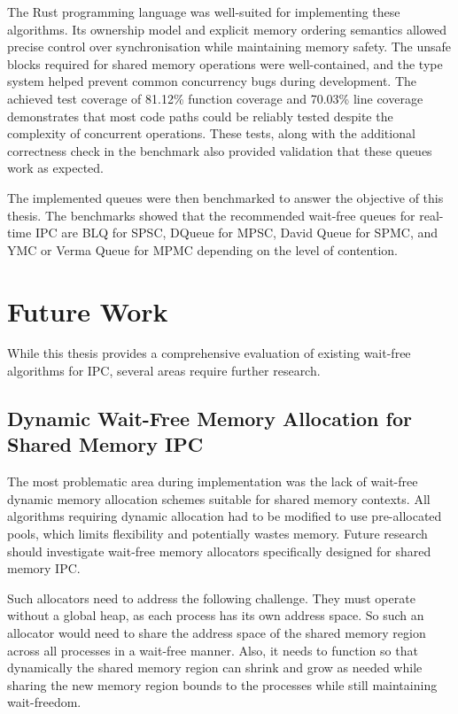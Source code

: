 The Rust programming language was well-suited for implementing these algorithms. Its ownership model and explicit memory ordering semantics allowed precise control over synchronisation while maintaining memory safety. The unsafe blocks required for shared memory operations were well-contained, and the type system helped prevent common concurrency bugs during development. The achieved test coverage of 81.12\% function coverage and 70.03\% line coverage demonstrates that most code paths could be reliably tested despite the complexity of concurrent operations. These tests, along with the additional correctness check in the benchmark also provided validation that these queues work as expected.

The implemented queues were then benchmarked to answer the objective of this thesis. The benchmarks showed that the recommended wait-free queues for real-time \ac{IPC} are \acf{BLQ} for \ac{SPSC}, DQueue for \ac{MPSC}, David Queue for \ac{SPMC}, and \ac{YMC} or Verma Queue for \ac{MPMC} depending on the level of contention.

\section{Future Work}
While this thesis provides a comprehensive evaluation of existing wait-free algorithms for \ac{IPC}, several areas require further research.

\subsection{Dynamic Wait-Free Memory Allocation for Shared Memory \acf{IPC}}
The most problematic area during implementation was the lack of wait-free dynamic memory allocation schemes suitable for shared memory contexts. All algorithms requiring dynamic allocation had to be modified to use pre-allocated pools, which limits flexibility and potentially wastes memory. Future research should investigate wait-free memory allocators specifically designed for shared memory \ac{IPC}.

Such allocators need to address the following challenge. They must operate without a global heap, as each process has its own address space. So such an allocator would need to share the address space of the shared memory region across all processes in a wait-free manner. Also, it needs to function so that dynamically the shared memory region can shrink and grow as needed while sharing the new memory region bounds to the processes while still maintaining wait-freedom.

